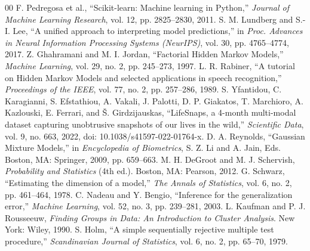 \documentclass[conference]{IEEEtran}
\begin{document}
\begin{thebibliography}{00}
 F. Pedregosa et al., ``Scikit-learn: Machine learning in Python,'' \emph{Journal of Machine Learning Research}, vol. 12, pp. 2825--2830, 2011.
 S. M. Lundberg and S.-I. Lee, ``A unified approach to interpreting model predictions,'' in \emph{Proc. Advances in Neural Information Processing Systems (NeurIPS)}, vol. 30, pp. 4765--4774, 2017.
 Z. Ghahramani and M. I. Jordan, ``Factorial Hidden Markov Models,'' \emph{Machine Learning}, vol. 29, no. 2, pp. 245--273, 1997.
 L. R. Rabiner, ``A tutorial on Hidden Markov Models and selected applications in speech recognition,'' \emph{Proceedings of the IEEE}, vol. 77, no. 2, pp. 257--286, 1989.
 S. Yfantidou, C. Karagianni, S. Efstathiou, A. Vakali, J. Palotti, D. P. Giakatos, T. Marchioro, A. Kazlouski, E. Ferrari, and {\v{S}}. Girdzijauskas, ``LifeSnaps, a 4-month multi-modal dataset capturing unobtrusive snapshots of our lives in the wild,'' \emph{Scientific Data}, vol. 9, no. 663, 2022, doi: 10.1038/s41597-022-01764-x.
 D. A. Reynolds, ``Gaussian Mixture Models,'' in \emph{Encyclopedia of Biometrics}, S. Z. Li and A. Jain, Eds. Boston, MA: Springer, 2009, pp. 659--663.
 M. H. DeGroot and M. J. Schervish, \emph{Probability and Statistics} (4th ed.). Boston, MA: Pearson, 2012.
 G. Schwarz, ``Estimating the dimension of a model,'' \emph{The Annals of Statistics}, vol. 6, no. 2, pp. 461--464, 1978.
 C. Nadeau and Y. Bengio, ``Inference for the generalization error,'' \emph{Machine Learning}, vol. 52, no. 3, pp. 239--281, 2003.
 L. Kaufman and P. J. Rousseeuw, \emph{Finding Groups in Data: An Introduction to Cluster Analysis}. New York: Wiley, 1990.
 S. Holm, ``A simple sequentially rejective multiple test procedure,'' \emph{Scandinavian Journal of Statistics}, vol. 6, no. 2, pp. 65--70, 1979.
\end{thebibliography}
\end{document}
